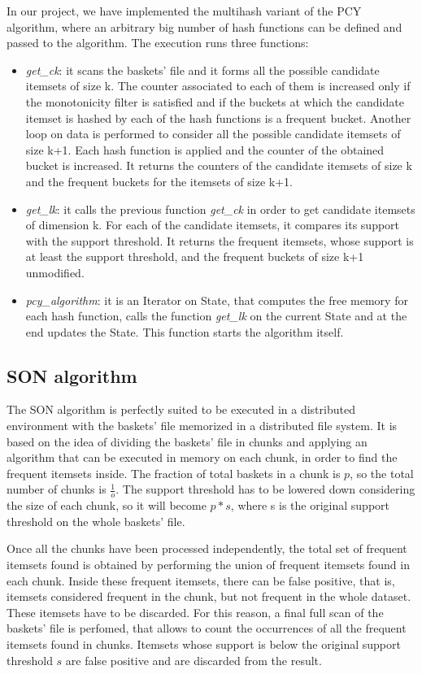 \documentclass[conference,compsoc]{IEEEtran}
\theoremstyle{definition}
\begin{document}
In our project, we have implemented the multihash variant of the PCY algorithm, where an arbitrary big number of hash functions can be defined and passed to the algorithm. The execution runs three functions:
\begin{itemize}
    \item \emph{get\_ck}: it scans the baskets' file and it forms all the possible candidate itemsets of size k. The counter associated to each of them is increased only if the monotonicity filter is satisfied and if the buckets at which the candidate itemset is hashed by each of the hash functions is a frequent bucket.
    Another loop on data is performed to consider all the possible candidate itemsets of size k+1. Each hash function is applied and the counter of the obtained bucket is increased. It returns the counters of the candidate itemsets of size k and the frequent buckets for the itemsets of size k+1.
    \item \emph{get\_lk}: it calls the previous function \emph{get\_ck} in order to get candidate itemsets of dimension k. For each of the candidate itemsets, it compares its support with the support threshold. It returns the frequent itemsets, whose support is at least the support threshold, and the frequent buckets of size k+1 unmodified. 
    \item \emph{pcy\_algorithm}: it is an Iterator on State, that computes the free memory for each hash function, calls the function \emph{get\_lk} on the current State and at the end updates the State. This function starts the algorithm itself.
\end{itemize}

\subsection{SON algorithm}

The SON algorithm is perfectly suited to be executed in a distributed environment with the baskets' file memorized in a distributed file system. It is based on the idea of dividing the baskets' file in chunks and applying an algorithm that can be executed in memory on each chunk, in order to find the frequent itemsets inside. The fraction of total baskets in a chunk is \(p\), so the total number of chunks is \(\frac{1}{o}\). The support threshold has to be lowered down considering the size of each chunk, so it will become \(p*s\), where s is the original support threshold on the whole baskets' file. 

Once all the chunks have been processed independently, the total set of frequent itemsets found is obtained by performing the union of frequent itemsets found in each chunk. Inside these frequent itemsets, there can be false positive, that is, itemsets considered frequent in the chunk, but not frequent in the whole dataset. These itemsets have to be discarded. For this reason, a final full scan of the baskets' file is perfomed, that allows to count the occurrences of all the frequent itemsets found in chunks. Itemsets whose support is below the original support threshold \(s\) are false positive and are discarded from the result. 
\end{document}
